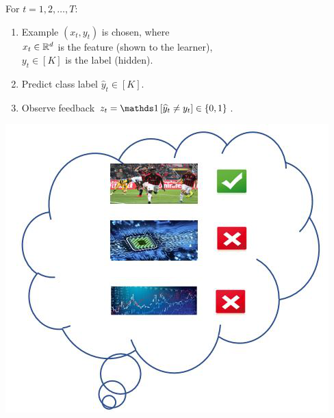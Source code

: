 \documentclass[landscape,a0a,final]{a0poster}
\begin{document}
\begin{multicols}{3}
\begin{minipage}{0.6\linewidth}
\begin{framed}
For $t=1,2,\dots,T$:
\begin{enumerate}
\item Example $(x_t, y_t)$ is chosen, where \\
\qquad $x_t \in \mathbb{R}^d$ is the {\color{red}feature (shown to the learner)}, \\
\qquad $y_t \in [K]$ is the {\color{blue}label (hidden)}.\\
\item Predict class label $\widehat y_t \in [K]$.\\
\item Observe feedback $z_t = \indicator{\widehat y_t \neq y_t} \in \{0,1\}$.
\end{enumerate}
\end{framed}
\end{minipage}
\hspace{0.3cm}
\begin{minipage}{0.35\linewidth}
\begin{minipage}{0.35\linewidth}
\vspace{-1cm}
\includegraphics[width=1.8\linewidth]{figures/label.png}
\\

\end{minipage}
\end{minipage}
\end{multicols}
\end{document}
